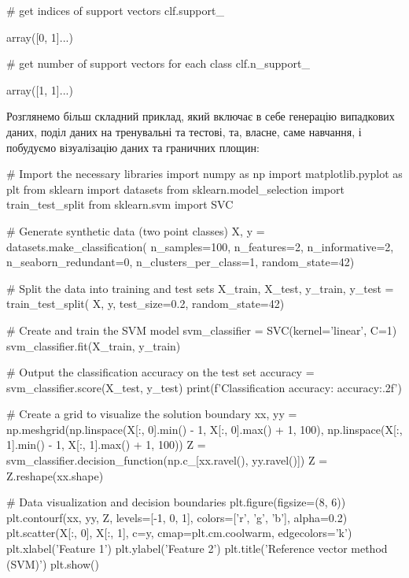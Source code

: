 \documentclass[]{article}
\begin{document}
\begin{notebook}
# get indices of support vectors
clf.support_
\end{notebook}

\begin{out}
array([0, 1]...)
\end{out}

\begin{notebook}
# get number of support vectors for each class
clf.n_support_
\end{notebook}

\begin{out}
array([1, 1]...)
\end{out}

Розглянемо більш складний приклад, який включає в себе генерацію випадкових даних, поділ даних на тренувальні та тестові, та, власне, саме навчання,  і побудуємо візуалізацію даних та граничних площин:

\begin{pythoncode}
# Import the necessary libraries
import numpy as np
import matplotlib.pyplot as plt
from sklearn import datasets
from sklearn.model_selection import train_test_split
from sklearn.svm import SVC

# Generate synthetic data (two point classes)
X, y = datasets.make_classification(
    n_samples=100,
    n_features=2,
    n_informative=2,
    n_seaborn_redundant=0,
    n_clusters_per_class=1,
    random_state=42)

# Split the data into training and test sets
X_train, X_test, y_train, y_test = train_test_split(
    X, y, test_size=0.2, random_state=42)

# Create and train the SVM model
svm_classifier = SVC(kernel='linear', C=1)
svm_classifier.fit(X_train, y_train)

# Output the classification accuracy on the test set
accuracy = svm_classifier.score(X_test, y_test)
print(f'Classification accuracy: {accuracy:.2f}')

# Create a grid to visualize the solution boundary
xx, yy = np.meshgrid(np.linspace(X[:, 0].min() - 1,
                                 X[:, 0].max() + 1, 100),
                     np.linspace(X[:, 1].min() - 1,
                                 X[:, 1].max() + 1, 100))
Z = svm_classifier.decision_function(np.c_[xx.ravel(), yy.ravel()])
Z = Z.reshape(xx.shape)

# Data visualization and decision boundaries
plt.figure(figsize=(8, 6))
plt.contourf(xx, yy, Z,
             levels=[-1, 0, 1],
             colors=['r', 'g', 'b'], alpha=0.2)
plt.scatter(X[:, 0], X[:, 1], c=y,
            cmap=plt.cm.coolwarm,
            edgecolors='k')
plt.xlabel('Feature 1')
plt.ylabel('Feature 2')
plt.title('Reference vector method (SVM)')
plt.show()
\end{pythoncode}
\end{document}
